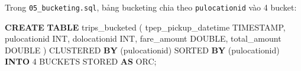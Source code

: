 \documentclass[
  12pt,
  a4paper,
]{article}
\newenvironment{Shaded}{}{}
\newcommand{\DataTypeTok}[1]{\textcolor[rgb]{0.56,0.13,0.00}{#1}}
\newcommand{\DecValTok}[1]{\textcolor[rgb]{0.25,0.63,0.44}{#1}}
\newcommand{\KeywordTok}[1]{\textcolor[rgb]{0.00,0.44,0.13}{\textbf{#1}}}
\newcommand{\NormalTok}[1]{#1}
\begin{document}
Trong
\texttt{05\_}\allowbreak{}\texttt{bucketing.}\allowbreak{}\texttt{sql}\allowbreak{},
bảng bucketing chia theo \texttt{pulocationid} vào 4 bucket:

\begin{Shaded}
\begin{Highlighting}[]
\KeywordTok{CREATE} \KeywordTok{TABLE}\NormalTok{ trips\_bucketed (}
\NormalTok{  tpep\_pickup\_datetime }\DataTypeTok{TIMESTAMP}\NormalTok{, pulocationid }\DataTypeTok{INT}\NormalTok{, dolocationid }\DataTypeTok{INT}\NormalTok{,}
\NormalTok{  fare\_amount }\DataTypeTok{DOUBLE}\NormalTok{, total\_amount }\DataTypeTok{DOUBLE}
\NormalTok{)}
\NormalTok{CLUSTERED }\KeywordTok{BY}\NormalTok{ (pulocationid) SORTED }\KeywordTok{BY}\NormalTok{ (pulocationid) }\KeywordTok{INTO} \DecValTok{4}\NormalTok{ BUCKETS}
\NormalTok{STORED }\KeywordTok{AS}\NormalTok{ ORC;}
\end{Highlighting}
\end{Shaded}
\end{document}
